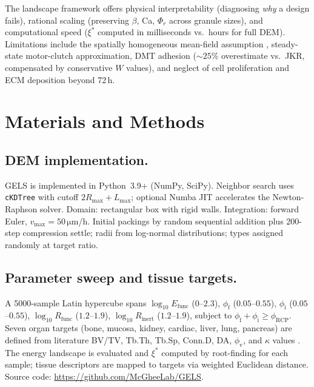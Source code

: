 \documentclass[9pt,twocolumn,twoside]{pnas-new}
\newcommand{\phif}{\phi_\mathrm{f}}
\newcommand{\phii}{\phi_\mathrm{i}}
\newcommand{\phiv}{\phi_\mathrm{v}}
\newcommand{\phiRCP}{\phi_\mathrm{RCP}}
\newcommand{\xistar}{\xi^{*}}
\newcommand{\um}{\,\si{\micro\metre}}
\begin{document}
The landscape framework offers physical interpretability (diagnosing
\textit{why} a design fails), rational scaling (preserving $\beta$, Ca,
$\Phi_r$ across granule sizes), and computational speed ($\xistar$ computed
in milliseconds vs.\ hours for full DEM). Limitations include the
spatially homogeneous mean-field assumption \cite{Tighe2010}, steady-state
motor-clutch approximation, DMT adhesion (${{\sim}}25\%$ overestimate vs.\
JKR, compensated by conservative $W$ values), and neglect of cell
proliferation and ECM deposition beyond 72\,h.

\section*{Materials and Methods}

\subsection*{DEM implementation.}
GELS is implemented in Python~3.9+ (NumPy, SciPy). Neighbor search
uses \texttt{cKDTree} with cutoff $2R_\mathrm{max} + L_\mathrm{max}$;
optional Numba JIT accelerates the Newton-Raphson solver. Domain: rectangular
box with rigid walls. Integration: forward Euler, $v_\mathrm{max} = 50\um$/h.
Initial packings by random sequential addition plus 200-step compression settle;
radii from log-normal distributions; types assigned randomly at target ratio.

\subsection*{Parameter sweep and tissue targets.}
A 5000-sample Latin hypercube spans $\log_{10} E_\mathrm{func}$ ($0$--$2.3$),
$\phif$ ($0.05$--$0.55$), $\phii$ ($0.05$--$0.55$), $\log_{10}R_\mathrm{func}$
($1.2$--$1.9$), $\log_{10}R_\mathrm{inert}$ ($1.2$--$1.9$), subject to
$\phif + \phii \geq \phiRCP$. Seven organ targets (bone, mucosa, kidney,
cardiac, liver, lung, pancreas) are defined from literature BV/TV, Tb.Th,
Tb.Sp, Conn.D, DA, $\phiv$, and $\kappa$ values
\cite{Hollister2005,Harrigan1984,Hildebrand1997}. The energy landscape is
evaluated and $\xistar$ computed by root-finding for each sample; tissue
descriptors are mapped to targets via weighted Euclidean distance. Source
code: \url{https://github.com/McGheeLab/GELS}.

\end{document}
